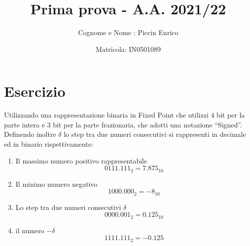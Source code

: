 \documentclass[a4paper]{extarticle}
\title{\textbf{Prima prova - A.A. 2021/22\\}}
\author{Cognome e Nome : Piccin Enrico}
\date{Matricola: IN0501089}
\begin{document}
\vspace{-10mm}
\maketitle

\noindent
\section{Esercizio}
Utilizzando una rappresentazione binaria in Fixed Point che utilizzi $4$ bit per la parte intera e $3$ bit per la parte frazionaria, che adotti una notazione “Signed”. Definendo inoltre $\delta$ lo step tra due numeri consecutivi si rappresenti in decimale ed in binario rispettivamente:
\begin{enumerate}
    \item Il massimo numero positivo rappresentabile
    \[0111.111_2 = 7.875_{10}\]
    \item Il minimo numero negativo
    \[1000.000_2 = -8_{10}\]
    \item Lo step tra due numeri consecutivi $\delta$
    \[0000.001_2 = 0.125_{10}\]
    \item il numero $-\delta$
    \[1111.111_2 = -0.125\]
\end{enumerate}

\noindent
\end{document}
